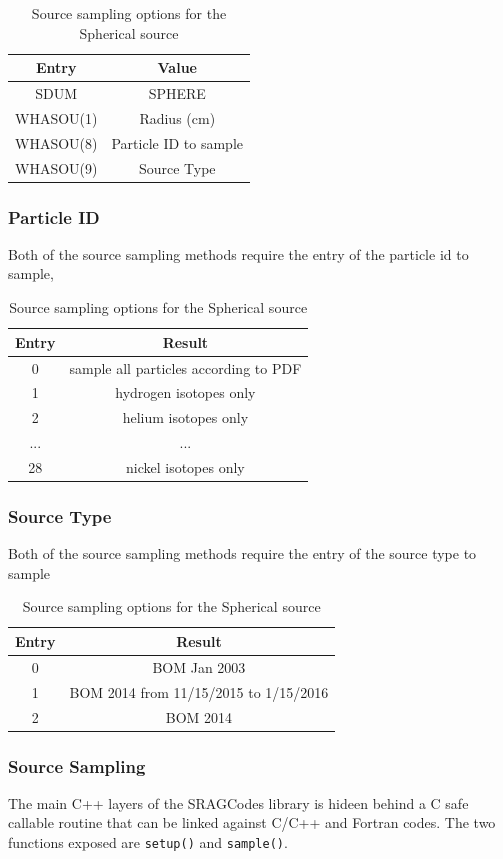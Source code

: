 \begin{table}[ht!]
 \begin{tabular}{c|c}
 Entry & Value \\
 \hline
 SDUM & SPHERE \\
 WHASOU(1) & Radius (cm) \\
 WHASOU(8) & Particle ID to sample \\
 WHASOU(9) & Source Type 
 \end{tabular}
\label{tab:sphere_source}
\caption{Source sampling options for the Spherical source}
\end{table}

\subsubsection*{Particle ID}
Both of the source sampling methods require the entry of the particle id to sample,
\begin{table}[ht!]
 \begin{tabular}{c|c}
 Entry & Result \\
 \hline
 0  & sample all particles according to PDF \\
 1  & hydrogen isotopes only \\
 2  & helium isotopes only \\
 ... & ... \\
 28 & nickel isotopes only \\
 \end{tabular}
\label{tab:particleid}
\caption{Source sampling options for the Spherical source}
\end{table}

\subsubsection*{Source Type}
Both of the source sampling methods require the entry of the source type to sample
\begin{table}[ht!]
 \begin{tabular}{c|c}
 Entry & Result \\
 \hline
 0  & BOM Jan 2003 \\
 1  & BOM 2014 from 11/15/2015 to 1/15/2016 \\
 2  & BOM 2014 \\
 \end{tabular}
\label{tab:source_type}
\caption{Source sampling options for the Spherical source}
\end{table}

\subsubsection*{Source Sampling}
The main C++ layers of the SRAGCodes library is hideen behind a C safe callable routine that can be linked
against C/C++ and Fortran codes. The two functions exposed are \texttt{setup()} and \texttt{sample()}. 

